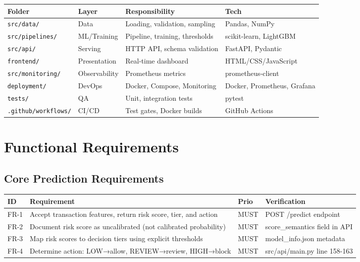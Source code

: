 \documentclass[12pt,a4paper]{article}
\begin{document}
\begin{table}[H]
\centering
\small
\begin{tabular}{|l|l|l|p{3cm}|}
\hline
\textbf{Folder} & \textbf{Layer} & \textbf{Responsibility} & \textbf{Tech} \\
\hline
\texttt{src/data/} & Data & Loading, validation, sampling & Pandas, NumPy \\
\hline
\texttt{src/pipelines/} & ML/Training & Pipeline, training, thresholds & scikit-learn, LightGBM \\
\hline
\texttt{src/api/} & Serving & HTTP API, schema validation & FastAPI, Pydantic \\
\hline
\texttt{frontend/} & Presentation & Real-time dashboard & HTML/CSS/JavaScript \\
\hline
\texttt{src/monitoring/} & Observability & Prometheus metrics & prometheus-client \\
\hline
\texttt{deployment/} & DevOps & Docker, Compose, Monitoring & Docker, Prometheus, Grafana \\
\hline
\texttt{tests/} & QA & Unit, integration tests & pytest \\
\hline
\texttt{.github/workflows/} & CI/CD & Test gates, Docker builds & GitHub Actions \\
\hline
\end{tabular}
\end{table}

\section{Functional Requirements}

\subsection{Core Prediction Requirements}

\begin{longtable}{|p{0.6cm}|p{3cm}|p{2cm}|p{3.5cm}|}
\hline
\textbf{ID} & \textbf{Requirement} & \textbf{Prio} & \textbf{Verification} \\
\hline
FR-1 & Accept transaction features, return risk score, tier, and action & MUST & POST /predict endpoint \\
FR-2 & Document risk score as uncalibrated (not calibrated probability) & MUST & score\_semantics field in API \\
FR-3 & Map risk scores to decision tiers using explicit thresholds & MUST & model\_info.json metadata \\
FR-4 & Determine action: LOW→allow, REVIEW→review, HIGH→block & MUST & src/api/main.py line 158-163 \\
\hline
\end{longtable}
\end{document}
